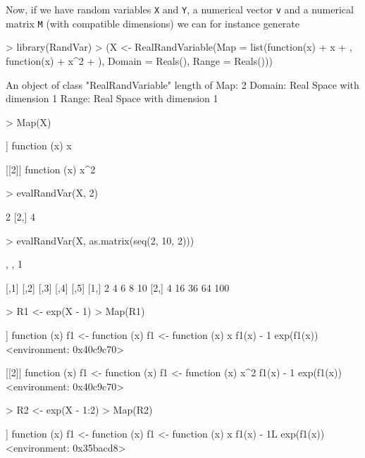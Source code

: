 \documentclass[11pt]{article}
\begin{document}
Now, if we have random variables {\tt X} and {\tt Y}, a numerical
vector {\tt v} and a numerical matrix {\tt M} (with compatible dimensions)
we can for instance generate
\begin{Schunk}
\begin{Sinput}
> library(RandVar)
> (X <- RealRandVariable(Map = list(function(x) {
+     x
+ }, function(x) {
+     x^2
+ }), Domain = Reals(), Range = Reals()))
\end{Sinput}
\begin{Soutput}
An object of class "RealRandVariable" 
length of Map:	 2 
Domain:	Real Space with dimension 1 
Range:	Real Space with dimension 1 
\end{Soutput}
\begin{Sinput}
> Map(X)
\end{Sinput}
\begin{Soutput}
[[1]]
function (x) 
{
    x
}

[[2]]
function (x) 
{
    x^2
}
\end{Soutput}
\begin{Sinput}
> evalRandVar(X, 2)
\end{Sinput}
\begin{Soutput}
     [,1]
[1,]    2
[2,]    4
\end{Soutput}
\begin{Sinput}
> evalRandVar(X, as.matrix(seq(2, 10, 2)))
\end{Sinput}
\begin{Soutput}
, , 1

     [,1] [,2] [,3] [,4] [,5]
[1,]    2    4    6    8   10
[2,]    4   16   36   64  100
\end{Soutput}
\begin{Sinput}
> R1 <- exp(X - 1)
> Map(R1)
\end{Sinput}
\begin{Soutput}
[[1]]
function (x) 
{
    f1 <- function (x) 
    {
        f1 <- function (x) 
        {
            x
        }
        f1(x) - 1
    }
    exp(f1(x))
}
<environment: 0x40c9c70>

[[2]]
function (x) 
{
    f1 <- function (x) 
    {
        f1 <- function (x) 
        {
            x^2
        }
        f1(x) - 1
    }
    exp(f1(x))
}
<environment: 0x40c9c70>
\end{Soutput}
\begin{Sinput}
> R2 <- exp(X - 1:2)
> Map(R2)
\end{Sinput}
\begin{Soutput}
[[1]]
function (x) 
{
    f1 <- function (x) 
    {
        f1 <- function (x) 
        {
            x
        }
        f1(x) - 1L
    }
    exp(f1(x))
}
<environment: 0x35bacd8>


\end{Soutput}
\end{Schunk}
\end{document}
